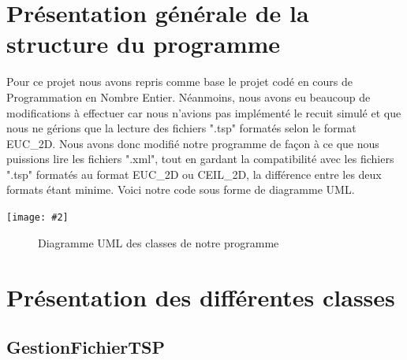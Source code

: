 \documentclass{article}
\newcommand{\img}[3][0.75]
{%
\begin{center}%
	\texttt{[image: \#2]}%
	\begin{figure}[ht]%
		\caption{#3}%
	\end{figure}%
\end{center}%
}
\newcommand{\code}[1]{}
\begin{document}




\section{Présentation générale de la structure du programme}

Pour ce projet nous avons repris comme base le projet codé en cours de Programmation en Nombre Entier.
Néanmoins, nous avons eu beaucoup de modifications à effectuer car nous n'avions pas implémenté le recuit simulé et que nous ne gérions que la lecture des fichiers ".tsp" formatés selon le format EUC\_2D.
Nous avons donc modifié notre programme de façon à ce que nous puissions lire les fichiers ".xml", tout en gardant la compatibilité avec les fichiers ".tsp" formatés au format EUC\_2D ou CEIL\_2D, la différence entre les deux formats étant minime.
Voici notre code sous forme de diagramme UML.

\img[0.25]{class_diag.png}{Diagramme UML des classes de notre programme}

\section{Présentation des différentes classes}
\subsection{GestionFichierTSP}
\end{document}
